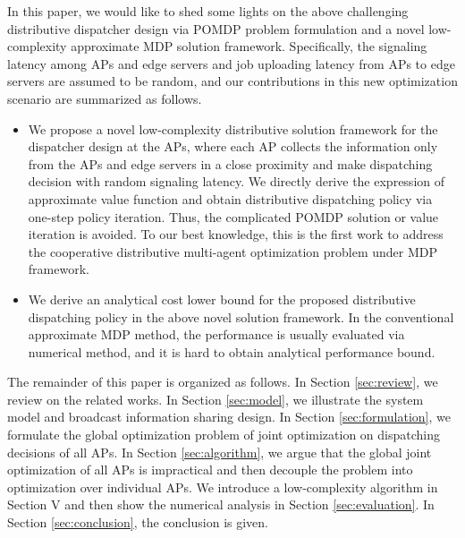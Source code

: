 In this paper, we would like to shed some lights on the above challenging distributive dispatcher design via POMDP problem formulation and a novel low-complexity approximate MDP solution framework.
Specifically, the signaling latency among APs and edge servers and job uploading latency from APs to edge servers are assumed to be random, and our contributions in this new optimization scenario are summarized as follows.
\begin{itemize}
    \item We propose a novel low-complexity distributive solution framework for the dispatcher design at the APs, where each AP collects the information only from the APs and edge servers in a close proximity and make dispatching decision with random signaling latency. We directly derive the expression of approximate value function and obtain distributive dispatching policy via one-step policy iteration. Thus, the complicated POMDP solution or value iteration is avoided. To our best knowledge, this is the first work to address the cooperative distributive multi-agent optimization problem under MDP framework.
    \item We derive an analytical cost lower bound for the proposed distributive dispatching policy in the above novel solution framework. In the conventional approximate MDP method, the performance is usually evaluated via numerical method, and it is hard to obtain analytical performance bound.
\end{itemize}

The remainder of this paper is organized as follows.
In Section \ref{sec:review}, we review on the related works.
In Section \ref{sec:model}, we illustrate the system model and broadcast information sharing design.
In Section \ref{sec:formulation}, we formulate the global optimization problem of joint optimization on dispatching decisions of all APs.
In Section \ref{sec:algorithm}, we argue that the global joint optimization of all APs is impractical and then decouple the problem into optimization over individual APs.
We introduce a low-complexity algorithm in Section V and then show the numerical analysis in Section \ref{sec:evaluation}.
In Section \ref{sec:conclusion}, the conclusion is given.

